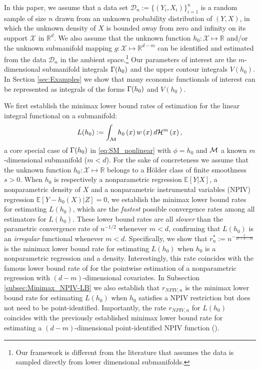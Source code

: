 \documentclass[12pt,american]{article}
\theoremstyle{definition}
\theoremstyle{plain}
\theoremstyle{definition}
\theoremstyle{plain}
\theoremstyle{plain}
\theoremstyle{plain}
\theoremstyle{plain}
\theoremstyle{plain}
\newcommand{\R}{\mathbb{R}}
\newcommand{\E}{\mathbb{E}}
\begin{document}
In this paper, we assume that a data set $\mathcal{D}_n:=\{(Y_i,X_i)\}_{i=1}^n$ is a random sample of size $n$ drawn from an unknown probability distribution of $(Y,X)$, in which the unknown density of $X$ is bounded away from zero and infinity on its support $\mathcal{X}$ in $\R^d$. We also assume that the unknown function $h_0:\mathcal{X} \mapsto \R$ and/or the unknown submanifold mapping $g:\mathcal{X} \mapsto \R^{d-m}$ can be identified and estimated from the data $\mathcal{D}_n$ in the ambient space.\footnote{Our framework is different from the literature that assumes the data is sampled directly from lower dimensional submanifolds.}  Our parameters of interest are the $m$-dimensional submanifold integrals $\Gamma(h_0)$ and the upper contour integrals $V(h_0)$. In Section \ref{sec:Examples} we show that many economic functionals of interest can be represented as integrals of the forms $\Gamma(h_0)$ and $V(h_0)$.


We first establish the minimax lower bound rates of estimation for the linear integral functional on a submanifold:
\begin{equation}
  L(h_0):=\int_{{\cal M}}h_{0}\left(x\right)w\left(x\right)d{\cal H}^{m}\left(x\right),\label{eq:SM_Int}
\end{equation}
a core special case of $\Gamma(h_0)$ in \eqref{eq:SM_nonlinear} with $\phi=h_0$ and ${\cal M}$ a known $m$-dimensional submanifold ($m < d$). For the sake of concreteness we assume that the unknown function $h_0:\mathcal{X} \mapsto \R$ belongs to a H\"{o}lder class of finite smoothness $s>0$. When $h_{0}$ is respectively a nonparametric regression $\E[Y|X]$, a nonparametric density of $X$ and a nonparametric instrumental variables (NPIV) regression $\E[Y-h_0 (X)|Z]=0$, we establish the minimax lower bound rates for estimating $L(h_0)$, which are the \textit{fastest} possible convergence rates among all estimators for $L(h_0)$. These lower bound rates are all \textit{slower} than the parametric convergence rate of $n^{-1/2}$ whenever $m<d$, confirming that $L(h_0)$ is an \textit{irregular} functional whenever $m<d$. Specifically, we show that $r^*_n:=n^{-\frac{s}{2s+d-m}}$ is the minimax lower bound rate for estimating $L(h_0)$ when $h_0$ is a nonparametric regression and a density. Interestingly, this rate coincides with the famous lower bound rate of \cite{stone1980optimal} for the pointwise estimation of a nonparametric regression with $(d-m)$-dimensional covariates. In Subsection \ref{subsec:Minimax_NPIV-LB} we also establish that $r_{NPIV,n}$ is the minimax lower bound rate for estimating $L(h_0)$ when $h_0$ satisfies a NPIV restriction but does not need to be point-identified.
Importantly, the rate $r_{NPIV,n}$ for $L(h_0)$ coincides with the previously established minimax lower bound rate for estimating a $(d-m)$-dimensional point-identified NPIV function (\cite{chen2011rate}).
\end{document}
